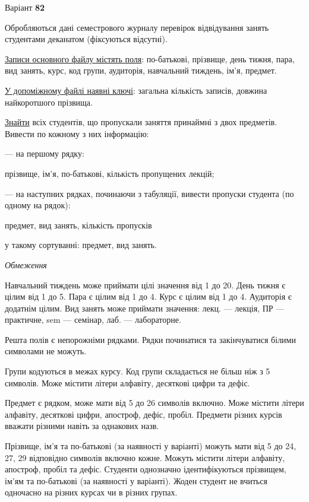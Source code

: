 \documentclass[11pt, ukrainian]{article}
\begin{document}
\par
\newpage
{\center Варіант  \No \textbf { 82 }\par}
\bigskip
Обробляються дані семестрового журналу перевірок відвідування занять студентами деканатом (фіксуються відсутні). 

\underline{Записи основного файлу містять поля}: по-батькові, прізвище, день тижня, пара, вид занять, курс, код групи, аудиторія, навчальний тиждень, ім’я, предмет.

\underline{У допоміжному файлі наявні ключі}: загальна кількість записів, довжина найкоротшого прізвища.

\underline{Знайти} всіх студентів, що пропускали заняття принаймні з двох предметів. Вивести по кожному з них інформацію:\par
{\noindent}--- на першому рядку:\par
прізвище, ім’я, по-батькові, кількість пропущених лекцій;

{\noindent}--- на наступних рядках, починаючи з табуляції, вивести пропуски студента (по одному на рядок):\par
предмет, вид занять, кількість пропусків

{\noindent}у такому сортуванні: предмет, вид занять.


\bigskip\textit{Обмеження}

Навчальний тиждень може приймати цілі значення від 1 до 20.
День тижня є цілим від 1 до 5. Пара є цілим від 1 до 4.
Курс є цілим від 1 до 4. Аудиторія є додатнім цілим.
Вид занять може приймати значення:
лекц. --- лекція, ПР --- практичне, sem --- семінар, лаб. --- лабораторне.

Решта полів є непорожніми рядками.
Рядки починатися та закінчуватися білими символами не можуть.

Групи кодуються в межах курсу.
Код групи складається не більш ніж з 5 символів.
Може містити літери алфавіту, десяткові цифри та дефіс.

Предмет є рядком, може мати від 5 до 26 символів включно.
Може містити літери алфавіту, десяткові цифри, апостроф, дефіс, пробіл.
Предмети різних курсів вважати різними навіть за однакових назв.

Прізвище, ім’я та по-батькові (за наявності у варіанті)
можуть мати від 5 до 24, 27, 29 відповідно символів включно кожне.
Можуть містити літери алфавіту, апостроф, пробіл та дефіс.
Студенти однозначно ідентифікуються прізвищем, ім’ям та по-батькові (за наявності у варіанті).
Жоден студент не вчиться одночасно на різних курсах чи в різних групах.
\end{document}
